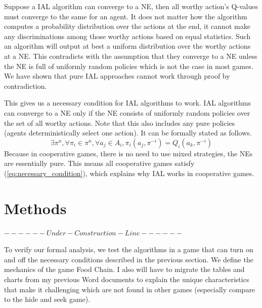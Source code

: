 \documentclass[a4paper]{article}
\begin{document}
\begin{multicols}{2}
Suppose a IAL algorithm can converge to a NE, then all worthy action's Q-values must converge to the same for an agent. It does not matter how the algorithm computes a probability distribution over the actions at the end, it cannot make any discriminations among those worthy actions based on equal statistics. Such an algorithm will output at best a uniform distribution over the worthy actions at a NE. This contradicts with the assumption that they converge to a NE unless the NE is full of uniformly random policies which is not the case in most games. We have shown that pure IAL approaches cannot work through proof by contradiction.

This gives us a necessary condition for IAL algorithms to work. IAL algorithms can converge to a NE only if the NE consists of uniformly random policies over the set of all worthy actions. Note that this also includes any pure policies (agents deterministically select one action). It can be formally stated as follows.
\begin{equation}
\exists \pi^n, \forall \pi_i \in \pi^n, \forall a_j \in A_i, \pi_i(a_j, \pi^{-i}) = Q_i(a_k, \pi^{-i})
\label{eq:necessary_condition}
\end{equation}
Because in cooperative games, there is no need to use mixed strategies, the NEs are essentially pure. This means all cooperative games satisfy (\ref{eq:necessary_condition}), which explains why IAL works in cooperative games.

\section{Methods}
\(------Under-Construction-Line------\)

To verify our formal analysis, we test the algorithms in a game that can turn on and off the necessary conditions described in the previous section. We define the mechanics of the game Food Chain. I also will have to migrate the tables and charts from my previous Word documents to explain the unique characteristics that make it challenging which are not found in other games (especially compare to the hide and seek game).


\end{multicols}
\end{document}
